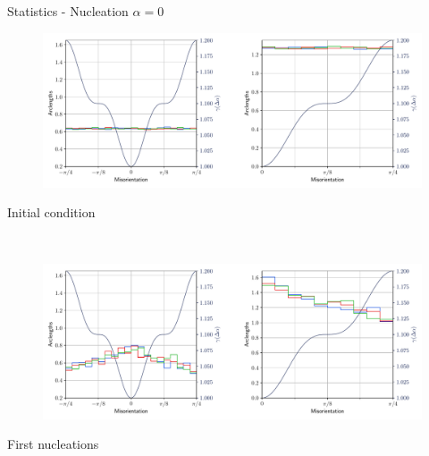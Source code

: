 \documentclass[usenames,dvipsnames]{beamer}
\begin{document}
\begin{frame}{Statistics - Nucleation $\alpha = 0$}
\small
    \begin{minipage}{\textwidth}
    \centering
    \vspace{-0.5em}
    \begin{figure}
    \centering
    \includegraphics[scale=0.33]{figures/stored_energy/SE/gbcd/000000_nuclconstant_set.pdf}
    \end{figure}
    \vspace{-2em}
    Initial condition
    \end{minipage}\\
    \begin{minipage}{\textwidth}
    \centering
    \begin{figure}
    \centering
    \includegraphics[scale=0.33]{figures/stored_energy/SE/gbcd/000070_nuclconstant_set.pdf}
    \end{figure}
    \vspace{-2em}
    First nucleations
    \end{minipage}
\end{frame}
\end{document}
